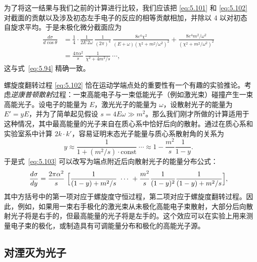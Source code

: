 为了将这一结果与我们之前的计算进行比较，我们应该把 \eqref{eq:5.101} 和 \eqref{eq:5.102} 对截面的贡献以及涉及初态左手电子的反应的相等贡献相加，并除以 4 以对初态自旋求平均。于是未极化微分截面应为
\begin{equation}
  \begin{aligned}
    \frac{d\sigma}{d\cos\theta} &= \frac{1}{4}\cdot\frac{1}{2E\,2\omega}\,
      \frac{1}{(2\pi)^4}\ \frac{8e^4\chi^2}{(E+\omega)(\chi^2+m^2/\omega^2)^2}
      + \frac{8e^4 m^2/\omega^2}{(\chi^2+m^2/\omega^2)^2}\\
    &= \frac{4\pi\alpha^2}{s}\ \frac{1}{\chi^2+4m^2/s}\ \cdots ,
  \end{aligned}
  \label{eq:5.103}
\end{equation}
这与式~\eqref{eq:5.94} 精确一致。

螺旋度翻转过程 \eqref{eq:5.102} 恰在运动学端点处的重要性有一个有趣的实验推论。考虑\emph{逆康普顿散射}过程：一束高能电子与一束低能光子（例如激光束）碰撞产生一束高能光子。设电子的能量为 $E$，激光光子的能量为 $\omega$，设散射光子的能量为 $E' = yE$，并为了简单起见假设 $s = 4E\omega \gg m^2$。那么我们刚才所做的计算适用于这种情况，其中最高能量的光子来自在质心系中恰好后向的散射。通过在质心系和实验室系中计算 $2k\cdot k'$，容易证明末态光子能量与质心系散射角的关系为
\begin{equation}
  y \approx \frac{1}{1 + (m^2/s)\cdot\text{const}}\ \cdots
    \approx 1 - \frac{m^2}{s}\frac{1}{1-y} .
\end{equation}
于是式~\eqref{eq:5.103} 可以改写为端点附近后向散射光子的能量分布公式：
\begin{equation}
  \frac{d\sigma}{dy} = \frac{2\pi\alpha^2}{s}\ \Bigl[
    \frac{1}{(1-y)+m^2/s}\ \cdots\ + \frac{m^2}{s}\frac{1}{(1-y)^2}
      \frac{1}{(1-y)+m^2/s} \Bigr] ,
  \label{eq:5.104}
\end{equation}
其中方括号中的第一项对应于螺旋度守恒过程，第二项对应于螺旋度翻转过程。因此，例如，如果用一束右手极化的激光束从未极化高能电子束散射，大部分后向散射光子将是右手的，但最高能量的光子将是左手的。这个效应可以在实验上用来测量电子束的极化，或制造具有可调能量分布和极化的高能光子源。

\subsection{对湮灭为光子}

